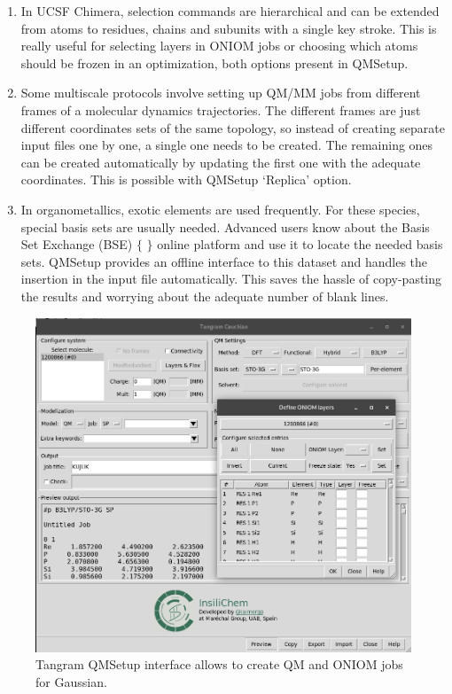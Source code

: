 \begin{enumerate}
	\item In UCSF Chimera, selection commands are hierarchical and can be extended from atoms to residues, chains and subunits with a single key stroke. This is really useful for selecting layers in ONIOM jobs or choosing which atoms should be frozen in an optimization, both options present in QMSetup.

	\item Some multiscale protocols involve setting up QM/MM jobs from different frames of a molecular dynamics trajectories. The different frames are just different coordinates sets of the same topology, so instead of creating separate input files one by one, a single one needs to be created. The remaining ones can be created automatically by updating the first one with the adequate coordinates. This is possible with QMSetup ‘Replica’ option.

	\item In organometallics, exotic elements are used frequently. For these species, special basis sets are usually needed. Advanced users know about the Basis Set Exchange (BSE) $ \{ $ $ \} $  online platform and use it to locate the needed basis sets. QMSetup provides an offline interface to this dataset and handles the insertion in the input file automatically. This saves the hassle of copy-pasting the results and worrying about the adequate number of blank lines.
\end{enumerate}



\begin{figure}
	\begin{Center}
		\includegraphics[width=\textwidth]{./figures/05/tangram_qm.png}
	\end{Center}
	\caption[Tangram QMSetup]{Tangram QMSetup interface allows to create QM and ONIOM jobs for Gaussian.}
	\label{fig:tangram-qmsetup}
\end{figure}


